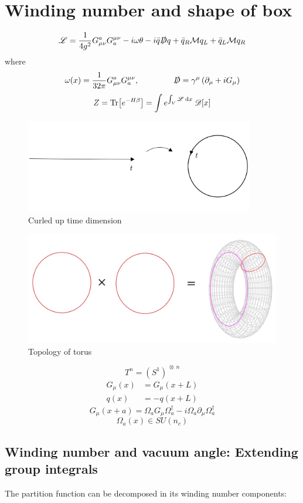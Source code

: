 \documentclass[a4,10pt,titlepage]{article}
\renewcommand\[{\begin{equation*}}
\renewcommand\]{\end{equation*}}
\newcommand{\be}{\begin{equation}}
\newcommand{\ee}{\end{equation}}
\numberwithin{equation}{section}
\newcommand{\ot}{\:\otimes\:}
\newcommand{\PD}{\mathscr{D}}
\newcommand{\lp}{\left}
\newcommand{\rp}{\right}
\newcommand{\Lar}{\mathscr{L}}
\newcommand{\D}{\slashed{D}}
\begin{document}
\section{Winding number and shape of box}
\be
\Lar=\frac{1}{4g^2}G^a_{\mu\nu}G_a^{\mu\nu}-i\omega\theta-i\bar q \D q+\bar q_R \mathcal{M} q_L + \bar q_L \mathcal{M} q_R 
\ee
where
\be
\omega(x)=\frac{1}{32\pi}G^a_{\mu\nu}G_a^{\mu\nu},\hspace*{1.5cm}\D=\gamma^\mu\lp( \partial_\mu+iG_\mu \rp)
\ee
\be
Z=\Tr[e^{-H\beta}]=\int e^{\int_V\Lar\:\dd x }\:\PD[x]
\ee
\begin{figure}[hb]
    \centering
    \includegraphics[width=10cm]{time.PNG}
    \caption{Curled up time dimension}
    \label{fig:my_label7}
\end{figure}
\begin{figure}[htb]
    \centering
    \includegraphics[width=12cm]{torus.PNG}
    \caption{Topology of torus}
    \label{fig:my_label}
\end{figure}
\be
T^n=(S^1)^{\ot n}
\ee
\begin{align}
    G_\mu (x)&=G_\mu(x+L)\\
    q(x)&=-q(x+L)
\end{align}
\be
G_\mu(x+a)=\Omega_aG_\mu \Omega_a^\dagger-i\Omega_a\partial_\mu\Omega_a^\dagger
\ee
\[
\Omega_a(x)\in SU(n_c)
\]

\subsection{Winding number and vacuum angle: Extending group integrals}
The partition function can be decomposed in its winding number components:
\end{document}
